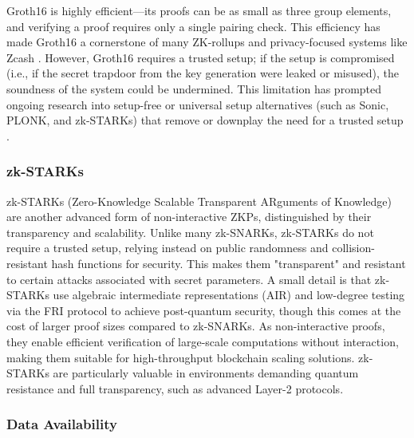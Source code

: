 \vspace{12pt}

Groth16 is highly efficient—its proofs can be as small as three group elements, and verifying a proof requires only a single pairing check. This efficiency has made Groth16 a cornerstone of many ZK-rollups and privacy-focused systems like Zcash \cite{Gro16}. However, Groth16 requires a trusted setup; if the setup is compromised (i.e., if the secret trapdoor from the key generation were leaked or misused), the soundness of the system could be undermined. This limitation has prompted ongoing research into setup-free or universal setup alternatives (such as Sonic, PLONK, and zk-STARKs) that remove or downplay the need for a trusted setup \cite{Ban25,BBHR18,GWC19,MBKM19,Hab25}.

\subsubsection{zk-STARKs}

\vspace{12pt}

zk-STARKs (Zero-Knowledge Scalable Transparent ARguments of Knowledge) are another advanced form of non-interactive ZKPs, distinguished by their transparency and scalability. Unlike many zk-SNARKs, zk-STARKs do not require a trusted setup, relying instead on public randomness and collision-resistant hash functions for security. This makes them "transparent" and resistant to certain attacks associated with secret parameters\cite{BBHR18}. A small detail is that zk-STARKs use algebraic intermediate representations (AIR) and low-degree testing via the FRI protocol to achieve post-quantum security, though this comes at the cost of larger proof sizes compared to zk-SNARKs\cite{chainlink}. As non-interactive proofs, they enable efficient verification of large-scale computations without interaction, making them suitable for high-throughput blockchain scaling solutions\cite{BBHR18}. zk-STARKs are particularly valuable in environments demanding quantum resistance and full transparency, such as advanced Layer-2 protocols\cite{chainlink}.


\subsubsection{Data Availability}

\vspace{12pt}

